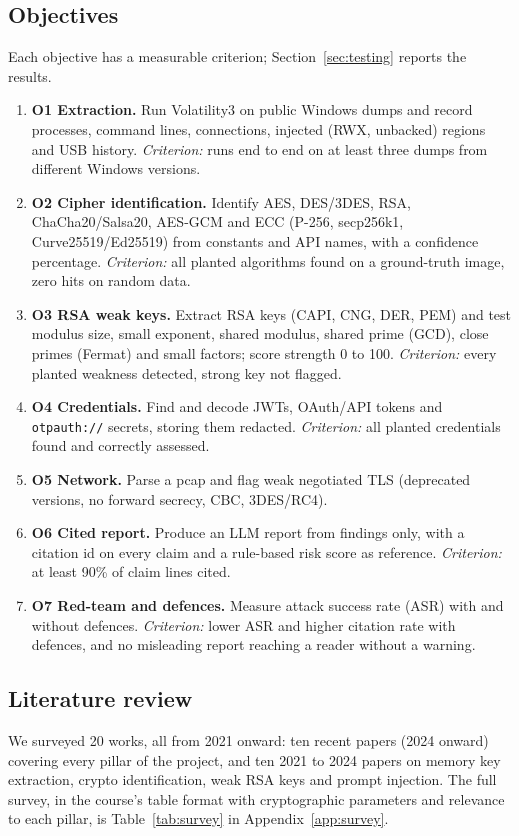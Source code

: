 \subsection{Objectives}
Each objective has a measurable criterion; Section~\ref{sec:testing} reports the results.
\begin{enumerate}
  \item \textbf{O1 Extraction.} Run Volatility3 on public Windows dumps and record processes, command
        lines, connections, injected (RWX, unbacked) regions and USB history. \emph{Criterion:} runs end to end
        on at least three dumps from different Windows versions.
  \item \textbf{O2 Cipher identification.} Identify AES, DES/3DES, RSA, ChaCha20/Salsa20, AES-GCM and
        ECC (P-256, secp256k1, Curve25519/Ed25519) from constants and API names, with a confidence
        percentage. \emph{Criterion:} all planted algorithms found on a ground-truth image, zero hits on random data.
  \item \textbf{O3 RSA weak keys.} Extract RSA keys (CAPI, CNG, DER, PEM) and test modulus size, small
        exponent, shared modulus, shared prime (GCD), close primes (Fermat) and small factors; score
        strength 0 to 100. \emph{Criterion:} every planted weakness detected, strong key not flagged.
  \item \textbf{O4 Credentials.} Find and decode JWTs, OAuth/API tokens and \texttt{otpauth://} secrets,
        storing them redacted. \emph{Criterion:} all planted credentials found and correctly assessed.
  \item \textbf{O5 Network.} Parse a pcap and flag weak negotiated TLS (deprecated versions, no forward
        secrecy, CBC, 3DES/RC4).
  \item \textbf{O6 Cited report.} Produce an LLM report from findings only, with a citation id on every
        claim and a rule-based risk score as reference. \emph{Criterion:} at least 90\% of claim lines cited.
  \item \textbf{O7 Red-team and defences.} Measure attack success rate (ASR) with and without defences.
        \emph{Criterion:} lower ASR and higher citation rate with defences, and no misleading report reaching a reader without a warning.
\end{enumerate}

\subsection{Literature review}
We surveyed 20 works, all from 2021 onward: ten recent papers (2024 onward) covering every pillar of the
project, and ten 2021 to 2024 papers on memory key extraction, crypto identification, weak RSA keys and prompt
injection. The full survey, in the course's table format with cryptographic parameters and relevance to each
pillar, is Table~\ref{tab:survey} in Appendix~\ref{app:survey}.

